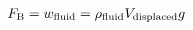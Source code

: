 

\vspace*{\fill}
\centering

\begin{align*}
   F_{\rm B} = w_{\rm fluid} = \rho_{\rm fluid} V_{\rm displaced} g
\end{align*}

\centering
\vspace*{\fill}

